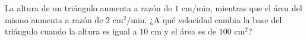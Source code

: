 \item La altura de un triángulo aumenta a razón de $1 \text{ cm/min}$, mientras que el área del mismo aumenta a razón de $2 \text{ cm}^2/\text{min}$. ¿A qué velocidad cambia la base del triángulo cuando la altura es igual a $10 \text{ cm}$ y el área es de $100 \text{ cm}^2$?
